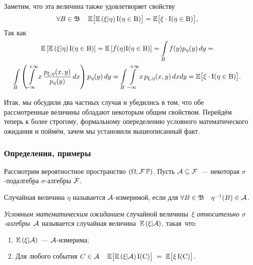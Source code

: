     \vspace{5mm}
    Заметим, что эта величина также удовлетворяет свойству
    \begin{equation*}
        \forall B \in \mathfrak{B} \quad \operatorname{\mathbb{E}} \bigl[ \operatorname{\mathbb{E}} \left( \xi | \eta\right) \rm{I}(\eta \in B)\bigr] = 
        \operatorname{\mathbb{E}} \bigl[ \xi \cdot \rm{I}(\eta \in B) \bigr],
    \end{equation*}
    Так как
    \begin{gather*}
        \operatorname{\mathbb{E}} \left[ \operatorname{\mathbb{E}} \left(\xi | \eta\right) \rm{I}(\eta \in B) \right] = 
        \operatorname{\mathbb{E}} \left[ f(\eta) \rm{I}(\eta \in B) \right] = 
        \int\limits_{B} f(y) p_{\eta}(y)\,dy = \\
        \int\limits_{B} \left( \int\limits_{-\infty}^{+\infty} x \, \frac{p_{\xi, \eta}(x, y)}{p_{\eta}(y)} \, dx \right) p_{\eta}(y) \,dy = 
        \int\limits_{B} \int\limits_{-\infty}^{+\infty} x \, p_{\xi, \eta}(x, y) \,dxdy = 
        \operatorname{\mathbb{E}} \bigl[ \xi \cdot \rm{I}(\eta \in B)\bigr].
    \end{gather*}

    Итак, мы обсудили два частных случая и убедились в том, что обе рассмотренные величины обладают некоторым общим свойством.
    Перейдём теперь к более строгому, формальному опеределению условного математического ожидания и поймём, зачем мы установили вышеописанный факт.

\subsubsection{Определения, примеры}
    Рассмотрим вероятностное пространство $(\Omega, \mathcal{F} \operatorname{\mathbb{P}})$.
    Пусть $\mathcal{A} \subseteq \mathcal{F}$~--- некоторая $\sigma$-подалгебра $\sigma$-алгебры $\mathcal{F}$.
    \begin{defn}
        Случайная величина $\eta$ называется $\mathcal{A}$-измеримой, если для $\forall B \in \mathfrak{B} \quad \eta^{-1}(B) \in \mathcal{A}$.
    \end{defn}
    
    \begin{defn}
        \textit{Условным математическим ожиданием} случайной величины~$\xi$ \textit{относительно $\sigma$-алгебры}~$\mathcal{A}$ 
        называется случайная величина~$\operatorname{\mathbb{E}} \left( \xi | \mathcal{A}\right)$, такая~что:
        \begin{enumerate}
            \item $\operatorname{\mathbb{E}} \left(\xi | \mathcal{A} \right)$~--- $\mathcal{A}$-измерима;
            \item Для любого события $C \in \mathcal{A} \quad \operatorname{\mathbb{E}} \bigl[ \operatorname{\mathbb{E}} \left( \xi | \mathcal{A} \right) \rm{I}(C) \bigr] \; = \; \operatorname{\mathbb{E}} \bigl[ \xi \, \rm{I}(C) \bigr]$.
        \end{enumerate}
    \end{defn}

